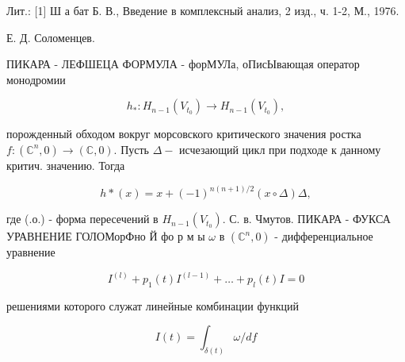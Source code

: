 \documentclass[10pt]{article}
\begin{document}
Лит.: [1] Ш а бат Б. В., Введение в комплексный анализ, 2 изд., ч. 1-2, М., 1976.



Е. Д. Соломенцев.



ПИКАРА - ЛЕФШЕЦА ФОРМУЛА - форМУЛа, оПисЫвающая оператор монодромии



\[

h_{*}: H_{n-1}\left(V_{t_{0}}\right) \rightarrow H_{n-1}\left(V_{t_{0}}\right),

\]



порожденный обходом вокруг морсовского критического значения ростка $f:\left(\mathbb{C}^{n}, 0\right) \rightarrow(\mathbb{C}, 0)$. Пусть $\Delta-$ исчезающий цикл при подходе к данному критич. значению. Тогда



\[

h *(x)=x+(-1)^{n(n+1) / 2}(x \circ \Delta) \Delta,

\]



где (.о.) - форма пересечений в $H_{n-1}\left(V_{t_{0}}\right)$. С. в. Чмутов. ПИКАРА - ФУКСА УРАВНЕНИЕ ГОЛОМорФно Й фо р м ы $\omega$ в $\left(\mathbb{C}^{n}, 0\right)$ - дифференциальное уравнение



\[

I^{(l)}+p_{1}(t) I^{(l-1)}+\ldots+p_{l}(t) I=0

\]



решениями которого служат линейные комбинации функций



\[

I(t)=\int_{\delta(t)} \omega / d f

\]
\end{document}
